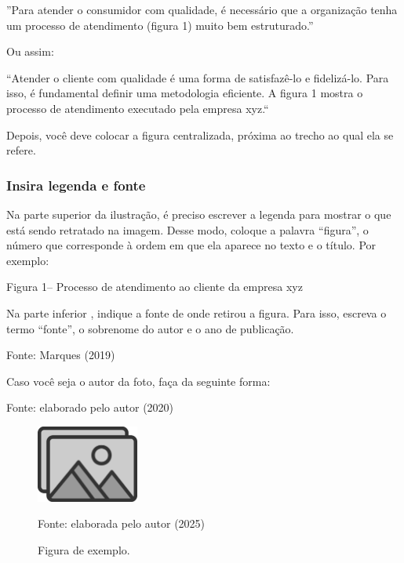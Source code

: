 ''Para atender o consumidor com qualidade, é necessário que a organização tenha um processo de atendimento (figura 1) muito bem estruturado.'' 

 Ou assim: 

``Atender o cliente com qualidade é uma forma de satisfazê-lo e fidelizá-lo. Para isso, é fundamental definir uma metodologia eficiente. A figura 1 mostra o processo de atendimento executado pela empresa xyz.`` 

Depois, você deve colocar a figura centralizada, próxima ao trecho ao qual ela se refere.

\subsubsection{Insira legenda e fonte}

Na parte superior da ilustração, é preciso escrever a legenda para mostrar o que está sendo retratado na imagem. Desse modo, coloque a palavra “figura”, o número que corresponde à ordem em que ela aparece no texto e o título. Por exemplo: 

Figura 1– Processo de atendimento ao cliente da empresa xyz 

Na parte inferior , indique a fonte de onde retirou a figura. Para isso, escreva o termo “fonte”, o sobrenome do autor e o ano de publicação. 

Fonte: Marques (2019)  

Caso você seja o autor da foto, faça da seguinte forma: 

Fonte: elaborado pelo autor (2020) 

\begin{figure}[ht]
    \centering
    \begin{small}
        \caption{Figura de exemplo.}
        \includegraphics[width=0.3\textwidth]{Figuras/placeholder_photo.jpg} %
        \label{fig:exemplo_fig}
        
        Fonte: elaborada pelo autor (2025)
    \end{small}
\end{figure} 

\newpage

